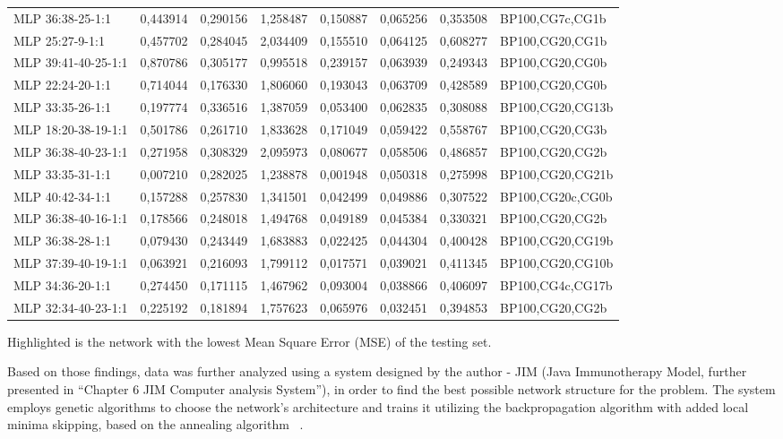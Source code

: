 \documentclass[10pt,oneside]{memoir}
\begin{document}
\begin{table}[htbp]
\begin{minipage}{\linewidth}
\begin{tabulary}{\linewidth}{@{}l@{}l@{}l@{}l@{}l@{}l@{}l@{}l@{}}
MLP 36:38-25-1:1&0,443914&0,290156&1,258487&0,150887&0,065256&0,353508&BP100,CG7c,CG1b \\
MLP 25:27-9-1:1&0,457702&0,284045&2,034409&0,155510&0,064125&0,608277&BP100,CG20,CG1b \\
MLP 39:41-40-25-1:1&0,870786&0,305177&0,995518&0,239157&0,063939&0,249343&BP100,CG20,CG0b \\
MLP 22:24-20-1:1&0,714044&0,176330&1,806060&0,193043&0,063709&0,428589&BP100,CG20,CG0b \\
MLP 33:35-26-1:1&0,197774&0,336516&1,387059&0,053400&0,062835&0,308088&BP100,CG20,CG13b \\
MLP 18:20-38-19-1:1&0,501786&0,261710&1,833628&0,171049&0,059422&0,558767&BP100,CG20,CG3b \\
MLP 36:38-40-23-1:1&0,271958&0,308329&2,095973&0,080677&0,058506&0,486857&BP100,CG20,CG2b \\
MLP 33:35-31-1:1&0,007210&0,282025&1,238878&0,001948&0,050318&0,275998&BP100,CG20,CG21b \\
MLP 40:42-34-1:1&0,157288&0,257830&1,341501&0,042499&0,049886&0,307522&BP100,CG20c,CG0b \\
MLP 36:38-40-16-1:1&0,178566&0,248018&1,494768&0,049189&0,045384&0,330321&BP100,CG20,CG2b \\
MLP 36:38-28-1:1&0,079430&0,243449&1,683883&0,022425&0,044304&0,400428&BP100,CG20,CG19b \\
MLP 37:39-40-19-1:1&0,063921&0,216093&1,799112&0,017571&0,039021&0,411345&BP100,CG20,CG10b \\
MLP 34:36-20-1:1&0,274450&0,171115&1,467962&0,093004&0,038866&0,406097&BP100,CG4c,CG17b \\
MLP 32:34-40-23-1:1&0,225192&0,181894&1,757623&0,065976&0,032451&0,394853&BP100,CG20,CG2b \\

		\bottomrule
	\end{tabulary}
\end{minipage}
\end{table}

Highlighted is the network with the lowest Mean Square Error (MSE) of the testing set.


Based on those findings, data was further analyzed using a system designed by the author  - JIM (Java Immunotherapy Model, further presented in ``Chapter 6 JIM Computer analysis System''), in order to find the best possible network structure for the problem. The system employs genetic algorithms to choose the network's architecture and trains it utilizing the backpropagation algorithm with added local minima skipping, based on the annealing algorithm ~\cite{Joone:2005:Documentation}.
\end{document}
